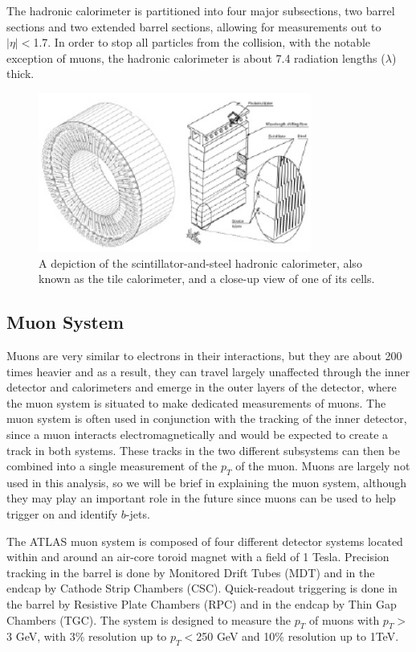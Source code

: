 The hadronic calorimeter is partitioned into four major subsections, two barrel sections and two extended barrel sections, allowing for measurements out to $|\eta|<$1.7.  In order to stop all particles from the collision, with the notable exception of muons, the hadronic calorimeter is about 7.4 radiation lengths ($\lambda$) thick.

\begin{figure}
	\includegraphics[width=0.8\textwidth]{ATLASDetector/images/tile_cal.pdf}
	\caption{A depiction of the scintillator-and-steel hadronic calorimeter, also known as the tile calorimeter, and a close-up view of one of its cells.	\label{fig:tile_cal}}
\end{figure}



\subsection{Muon System}
\label{sec:ms}
Muons are very similar to electrons in their interactions, but they are about 200 times heavier and as a result, they can travel largely unaffected through the inner detector and calorimeters and emerge in the outer layers of the detector, where the muon system is situated to make dedicated measurements of muons.  The muon system is often used in conjunction with the tracking of the inner detector, since a muon interacts electromagnetically and would be expected to create a track in both systems.  These tracks in the two different subsystems can then be combined into a single measurement of the $p_T$ of the muon.  Muons are largely not used in this analysis, so we will be brief in explaining the muon system, although they may play an important role in the future since muons can be used to help trigger on and identify $b$-jets.


The ATLAS muon system is composed of four different detector systems located within and around an air-core toroid magnet with a field of 1 Tesla.  Precision tracking in the barrel is done by Monitored Drift Tubes (MDT) and in the endcap by Cathode Strip Chambers (CSC).  Quick-readout triggering is done in the barrel by Resistive Plate Chambers (RPC) and in the endcap by Thin Gap Chambers (TGC).   The system is designed to measure the $p_T$ of muons with $p_T>$3 GeV, with 3\% resolution up to $p_T<$250 GeV and 10\% resolution up to 1TeV.  



